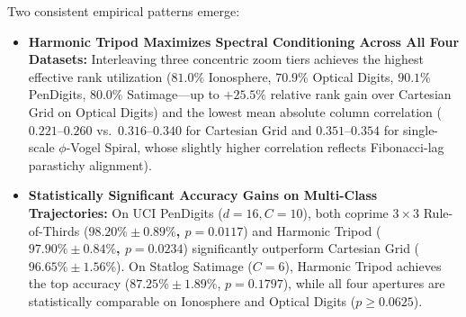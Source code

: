 Two consistent empirical patterns emerge:
\begin{itemize}
    \item \textbf{Harmonic Tripod Maximizes Spectral Conditioning Across All Four Datasets:} Interleaving three concentric zoom tiers achieves the highest effective rank utilization ($81.0\%$ Ionosphere, $70.9\%$ Optical Digits, $90.1\%$ PenDigits, $80.0\%$ Satimage---up to $+25.5\%$ relative rank gain over Cartesian Grid on Optical Digits) and the lowest mean absolute column correlation ($0.221\text{--}0.260$ vs.\ $0.316\text{--}0.340$ for Cartesian Grid and $0.351\text{--}0.354$ for single-scale $\phi$-Vogel Spiral, whose slightly higher correlation reflects Fibonacci-lag parastichy alignment).
    \item \textbf{Statistically Significant Accuracy Gains on Multi-Class Trajectories:} On UCI PenDigits ($d=16, C=10$), both coprime $3\times 3$ Rule-of-Thirds (\textbf{$98.20\%\pm 0.89\%$, $p=0.0117$}) and Harmonic Tripod (\textbf{$97.90\%\pm 0.84\%$, $p=0.0234$}) significantly outperform Cartesian Grid ($96.65\%\pm 1.56\%$). On Statlog Satimage ($C=6$), Harmonic Tripod achieves the top accuracy ($87.25\%\pm 1.89\%$, $p=0.1797$), while all four apertures are statistically comparable on Ionosphere and Optical Digits ($p \ge 0.0625$).
\end{itemize}


